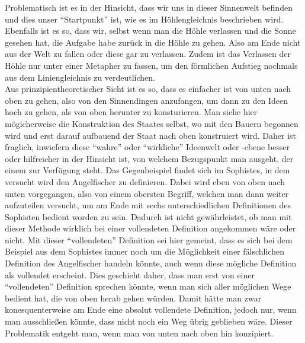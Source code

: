 Problematisch ist es in der Hinsicht, dass wir uns in dieser Sinnenwelt befinden und dies unser \enquote{Startpunkt} ist, wie es im Höhlengleichnis beschrieben wird. Ebenfalls ist es so, dass wir, selbst wenn man die Höhle verlassen und die Sonne gesehen hat, die Aufgabe habe zurück in die Höhle zu gehen. Also am Ende nicht aus der Welt zu fallen oder diese gar zu verlassen. Zudem ist das Verlassen der Höhle nur unter einer Metapher zu fassen, um den förmlichen Aufstieg nochmals aus dem Liniengleichnis zu verdeutlichen.\\
Aus prinzipientheoretischer Sicht ist es so, dass es einfacher ist von unten nach oben zu gehen, also von den Sinnendingen anzufangen, um dann zu den Ideen hoch zu gehen, als von oben herunter zu konsturieren. Man siehe hier mögicherweise die Konstruktion des Staates selbst, wo mit den Bauern begonnen wird und erst darauf aufbauend der Staat nach oben konstruiert wird. Daher ist fraglich, inwiefern diese \enquote{wahre} oder \enquote{wirkliche} Ideenwelt oder -ebene besser oder hilfreicher in der Hinsicht ist, von welchem Bezugspunkt man ausgeht, der einem zur Verfügung steht. 
Das Gegenbeispiel findet sich im Sophistes, in dem versucht wird den Angelfischer zu definieren. Dabei wird eben von oben nach unten vorgegangen, also von einem obersten Begriff, welchen man dann weiter aufzuteilen versucht, um am Ende mit sechs unterschiedlichen Definitionen des Sophisten bedient worden zu sein. Dadurch ist nicht gewährleistet, ob man mit dieser Methode wirklich bei einer vollendeten Definition angekommen wäre oder nicht. Mit dieser \enquote{vollendeten} Definition sei hier gemeint, dass es sich bei dem Beispiel aus dem Sophistes immer noch um die Möglichkeit einer fälschlichen Definition des Angelfischer handeln könnte, auch wenn diese mögliche Definition als vollendet erscheint. Dies geschieht daher, dass man erst von einer \enquote{vollendeten} Definition sprechen könnte, wenn man sich aller möglichen Wege bedient hat, die von oben herab gehen würden. Damit hätte man zwar konesquenterweise am Ende eine absolut vollendete Definition, jedoch nur, wenn man ausschließen könnte, dass nicht noch ein Weg übrig geblieben wäre. Dieser Problematik entgeht man, wenn man von unten nach oben hin konzipiert.\\
